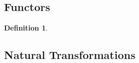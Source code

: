 \documentclass[12pt]{amsart}
\theoremstyle{definition}
\newtheorem{defn}[definition]{Definition}
\begin{document}
	
	
	
	
	
	
	
	
	
	
	
	
	
	
	
	
	
	
	
	
	
	
	
	
	
	
	
	
	
	
	\newpage
	\subsection{Functors}
	
	\begin{defn}
		
	\end{defn}
	
	
	
	
	
	
	
	
	
	
	
	
	
	
	
	
	
	
	
	
	
	
	
	
	
	
	
	
	
	
	
	
	\newpage
	\subsection{Natural Transformations}
	
	
\end{document}
